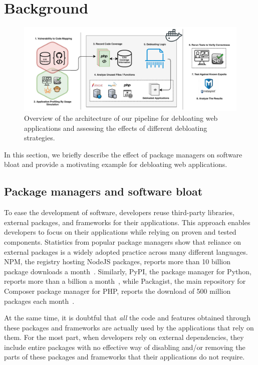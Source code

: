 \section{Background}
\label{sec:background}

\begin{figure}[t]
  \includegraphics[width=\linewidth]{figures/lim/DebloatingPipeline.pdf}
  \vspace{-6ex}
  \caption{Overview of the architecture of our pipeline for debloating web applications and assessing the effects of different debloating strategies.}
  \vspace{-2ex}
  \label{fig:debloatingpipeline}
\end{figure}

In this section, we briefly describe the effect of package managers on software
bloat and provide a motivating example for debloating web applications.


\subsection{Package managers and software bloat}
To ease the development of software, developers reuse third-party libraries,
external packages, and frameworks for their applications. This approach
enables developers to focus on their applications while relying on
proven and tested components. Statistics from popular package managers show
that reliance on external packages is a widely adopted practice across
many different languages. NPM, the registry hosting NodeJS packages,
reports more than 10 billion package downloads a
month~\cite{nodeDownloads}. Similarly, PyPI, the package manager for Python,
reports more than a billion a month~\cite{pypiDownloads}, while Packagist, the main repository for
Composer package manager for PHP, reports the download of 500 million
packages each month~\cite{packagistDownloads}.

At the same time, it is doubtful that \emph{all} the code and features
obtained through these packages and frameworks are actually used by
the applications that rely on them. For the most part, when developers rely on
external dependencies, they include entire packages with no effective way of
disabling and/or removing the parts of these packages and frameworks that
their applications do not require.


